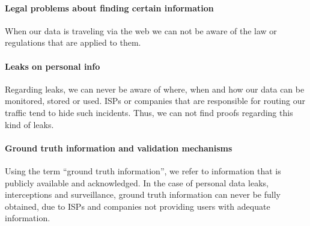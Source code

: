 \paragraph{Legal problems about finding certain information}
When our data is traveling via the web we can not be aware of the law or 
regulations that are applied to them. 

\paragraph{Leaks on personal info}
Regarding leaks, we can never be aware of where, when and how our data can be 
monitored, stored or used. ISPs or companies that are responsible for routing 
our traffic tend to hide such incidents. Thus, we can not find proofs regarding 
this kind of leaks. 

\paragraph{Ground truth information and validation mechanisms}
Using the term ``ground truth information'', we refer to information that is 
publicly available and acknowledged. In the case of personal data leaks, 
interceptions and surveillance, ground truth information can never be fully 
obtained, due to ISPs and companies not providing users with adequate 
information. 

